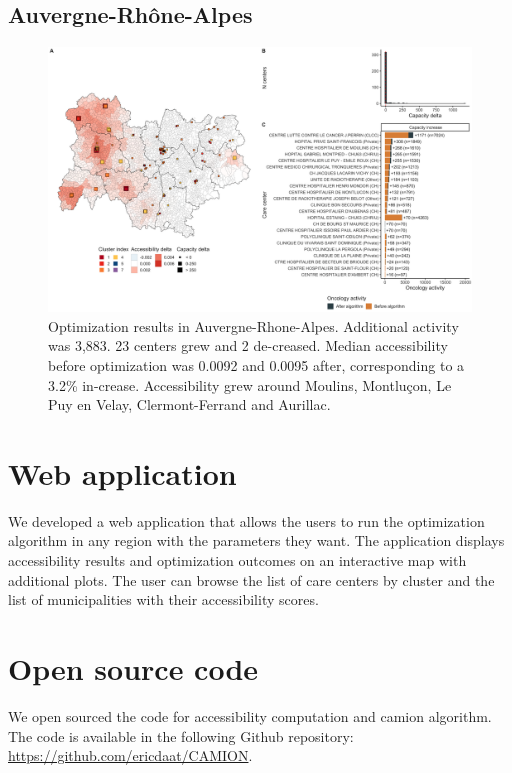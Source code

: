 \subsection*{Auvergne-Rhône-Alpes}

\begin{figure}[h]
    \includegraphics[width=\textwidth]{images/camion/optim_region/optim_Auvergne-Rhone-Alpes.png}
    \centering
    \caption{
        Optimization results in Auvergne-Rhone-Alpes. Additional activity was 3,883. 23 centers grew and 2 de-creased. Median accessibility before optimization was 0.0092 and 0.0095 after, corresponding to a 3.2\% in-crease. Accessibility grew around Moulins, Montluçon, Le Puy en Velay, Clermont-Ferrand and Aurillac.
    }
\end{figure}

\section{Web application}

We developed a web application that allows the users to run the optimization algorithm in any region with the parameters they want. The application displays accessibility results and optimization outcomes on an interactive map with additional plots. The user can browse the list of care centers by cluster and the list of municipalities with their accessibility scores.

\section{Open source code}

We open sourced the code for accessibility computation and \ac{camion} algorithm.
The code is available in the following Github repository: \url{https://github.com/ericdaat/CAMION}.

